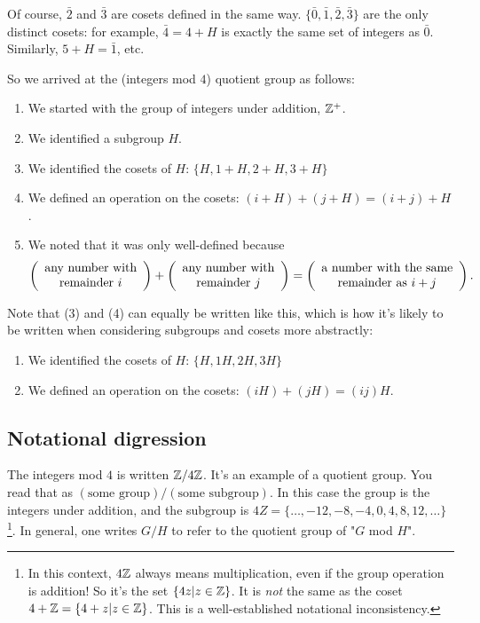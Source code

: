Of course, $\bar 2$ and $\bar 3$ are cosets defined in the same way. $\{\bar 0,
\bar 1, \bar 2, \bar 3\}$ are the only distinct cosets: for example, $\bar 4 =
4+H$ is exactly the same set of integers as $\bar 0$. Similarly, $5 + H = \bar
1$, etc.

So we arrived at the (integers mod $4$) quotient group as follows:

\begin{enumerate}
\item We started with the group of integers under addition, $\mathbb{Z}^+$.
\item We identified a subgroup $H$.
\item We identified the cosets of $H$: $\{H, 1+H, 2+H, 3+H\}$
\item We defined an operation on the cosets: $(i+H) + (j+H) = (i+j)+H$.
\item We noted that it was only well-defined because
  \begin{align*}
    \left(\begin{array}{c} \text{any number with} \\ \text{remainder $i$} \end{array}\right) +
    \left(\begin{array}{c} \text{any number with} \\ \text{remainder $j$} \end{array}\right) =
    \left(\begin{array}{c} \text{a number with the same} \\ \text{remainder as $i+j$} \end{array}\right).
  \end{align*}
\end{enumerate}

Note that (3) and (4) can equally be written like this, which is how it's
likely to be written when considering subgroups and cosets more abstractly:

\begin{enumerate}
\item We identified the cosets of $H$: $\{H, 1H, 2H, 3H\}$
\item We defined an operation on the cosets: $(iH) + (jH) = (ij)H$.
\end{enumerate}

\subsection{Notational digression}

The integers mod $4$ is written $\mathbb{Z}/4\mathbb{Z}$. It's an example of a quotient
group. You read that as $(\text{some group}) / (\text{some subgroup})$. In this
case the group is the integers under addition, and the subgroup is
$4Z = \{\ldots, -12, -8, -4, 0, 4, 8, 12, \ldots\}$\footnote{In this context,
  $4\mathbb{Z}$ always means multiplication, even if the group operation is addition!
  So it's the set $\{4z|z \in \mathbb{Z}\}$. It is \emph{not} the same as the coset
  $4 + \mathbb{Z} = \{4+z|z \in \mathbb{Z}\}$. This is a well-established notational
  inconsistency.}. In general, one writes $G/H$ to refer to the quotient group
of "$G$ mod $H$".


